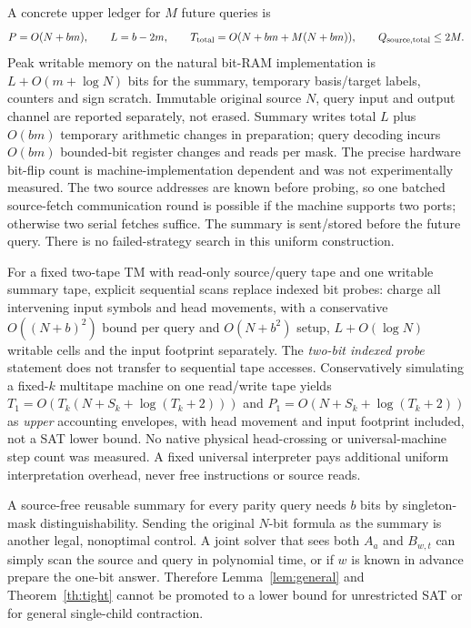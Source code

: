 \documentclass[10pt]{article}
\begin{document}
A concrete upper ledger for $M$ future queries is
\[
P=O(N+bm),\qquad L=b-2m,
\qquad T_{\rm total}=O(N+bm+M(N+bm)),
\qquad Q_{\rm source,total}\le2M.
\]
Peak writable memory on the natural bit-RAM implementation is $L+O(m+\log N)$ bits for the summary, temporary basis/target labels, counters and sign scratch. Immutable original source $N$, query input and output channel are reported separately, not erased. Summary writes total $L$ plus $O(bm)$ temporary arithmetic changes in preparation; query decoding incurs $O(bm)$ bounded-bit register changes and reads per mask. The precise hardware bit-flip count is machine-implementation dependent and was not experimentally measured. The two source addresses are known before probing, so one batched source-fetch communication round is possible if the machine supports two ports; otherwise two serial fetches suffice. The summary is sent/stored before the future query. There is no failed-strategy search in this uniform construction.

For a fixed two-tape TM with read-only source/query tape and one writable summary tape, explicit sequential scans replace indexed bit probes: charge all intervening input symbols and head movements, with a conservative $O((N+b)^2)$ bound per query and $O(N+b^2)$ setup, $L+O(\log N)$ writable cells and the input footprint separately. The \emph{two-bit indexed probe} statement does not transfer to sequential tape accesses. Conservatively simulating a fixed-$k$ multitape machine on one read/write tape yields $T_1=O(T_k(N+S_k+\log(T_k+2)))$ and $P_1=O(N+S_k+\log(T_k+2))$ as \emph{upper} accounting envelopes, with head movement and input footprint included, not a SAT lower bound. No native physical head-crossing or universal-machine step count was measured. A fixed universal interpreter pays additional uniform interpretation overhead, never free instructions or source reads.

A source-free reusable summary for every parity query needs $b$ bits by singleton-mask distinguishability. Sending the original $N$-bit formula as the summary is another legal, nonoptimal control. A joint solver that sees both $A_a$ and $B_{w,t}$ can simply scan the source and query in polynomial time, or if $w$ is known in advance prepare the one-bit answer. Therefore Lemma~\ref{lem:general} and Theorem~\ref{th:tight} cannot be promoted to a lower bound for unrestricted SAT or for general single-child contraction.
\end{document}
